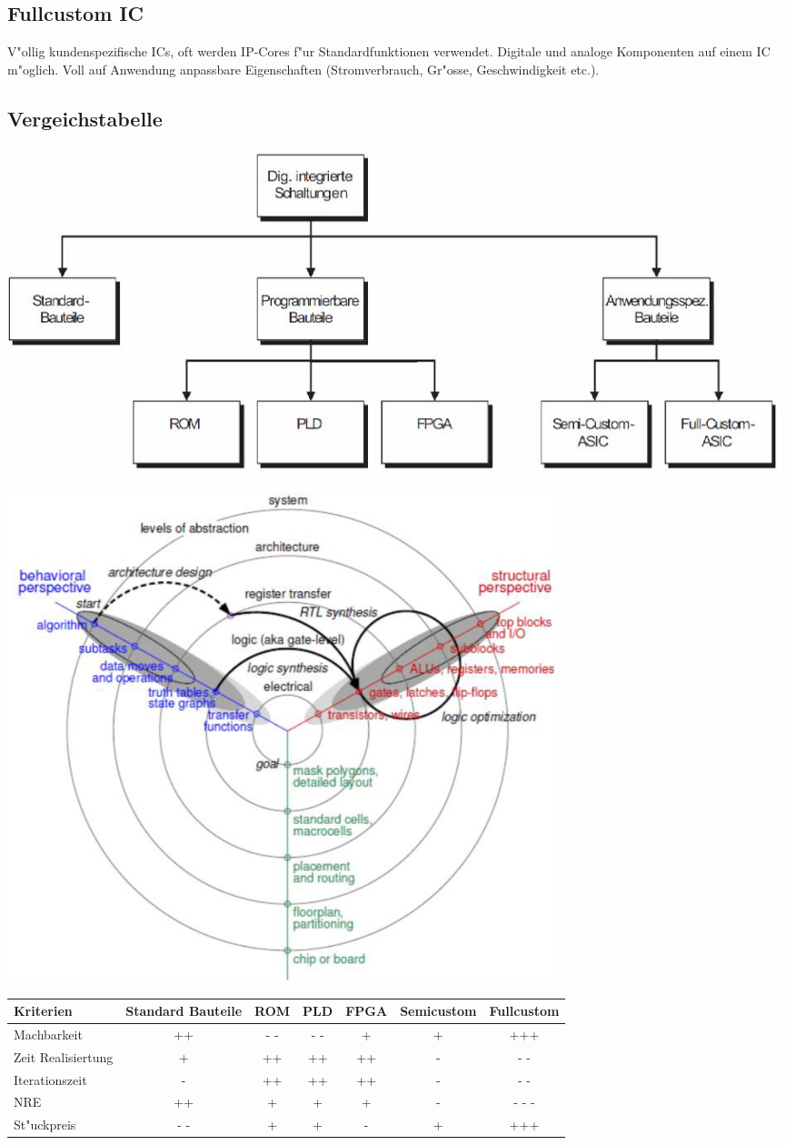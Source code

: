 \begin{scriptsize}
\subsection{Fullcustom IC}
V"ollig kundenspezifische ICs, oft werden IP-Cores f"ur Standardfunktionen verwendet. Digitale und analoge Komponenten auf einem IC m"oglich. Voll auf Anwendung anpassbare Eigenschaften (Stromverbrauch, Gr"osse, Geschwindigkeit etc.).

\end{scriptsize}

\subsection{Vergeichstabelle}
\begin{minipage}{0.41\textwidth}
\includegraphics[width=0.99\textwidth]{pics/devicecomparetables}
\end{minipage}
\hfill
\begin{minipage}{0.58\textwidth}
\includegraphics[width=0.7\textwidth]{pics/abstraktion.png}
\end{minipage}
	
	
	\begin{tabular}{|l|c|c|c|c|c|c|}
		\hline
		Kriterien & Standard Bauteile & ROM & PLD & FPGA & Semicustom & Fullcustom \\
		\hline
		Machbarkeit & ++ & - - & - - & + & + & +++ \\
		\hline
		Zeit Realisiertung & + & ++ & ++ & ++ & - & - - \\
		\hline
		Iterationszeit & - & ++ & ++ & ++ & - & - - \\
		\hline
		NRE & ++ & + & + & + & - & - - -\\
		\hline
		St"uckpreis & - - & + & + & - & + & +++ \\
		\hline
	\end{tabular}
	